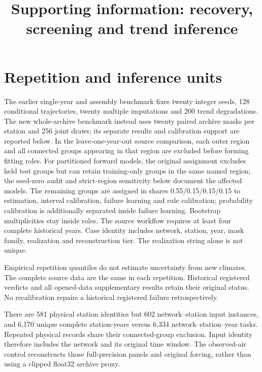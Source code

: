 \documentclass[draft]{agujournal2025}
\begin{document}
\title{Supporting information: recovery, screening and trend inference}
\maketitle\par
\section{Repetition and inference units}
The earlier single-year and assembly benchmark fixes twenty integer seeds, 128 conditional trajectories, twenty multiple imputations and 200 trend degradations. The new whole-archive benchmark instead uses twenty paired archive masks per station and 256 joint draws; its separate results and calibration support are reported below. In the leave-one-year-out source comparison, each outer region and all connected groups appearing in that region are excluded before forming fitting roles. For partitioned forward models, the original assignment excludes held test groups but can retain training-only groups in the same named region; the seed-zero audit and strict-region sensitivity below document the affected models. The remaining groups are assigned in shares 0.55/0.15/0.15/0.15 to estimation, interval calibration, failure learning and rule calibration; probability calibration is additionally separated inside failure learning. Bootstrap multiplicities stay inside roles. The source workflow requires at least four complete historical years. Case identity includes network, station, year, mask family, realization and reconstruction tier. The realization string alone is not unique.

Empirical repetition quantiles do not estimate uncertainty from new climates. The complete source data are the same in each repetition. Historical registered verdicts and all opened-data supplementary results retain their original status. No recalibration repairs a historical registered failure retrospectively.

There are 581 physical station identities but 602 network--station input instances, and 6,170 unique complete station-years versus 6,334 network--station--year tasks. Repeated physical records share their connected-group exclusion. Input identity therefore includes the network and its original time window. The observed-air control reconstructs those full-precision panels and original forcing, rather than using a clipped float32 archive proxy.
\end{document}
